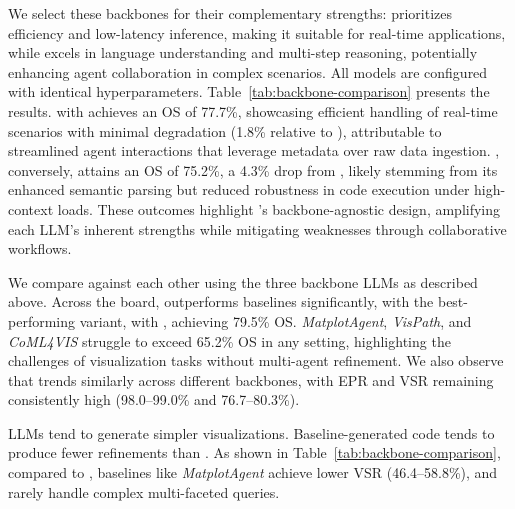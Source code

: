 We select these backbones for their complementary strengths:  prioritizes efficiency and low-latency inference, making it suitable for real-time applications, while  excels in language understanding and multi-step reasoning, potentially enhancing agent collaboration in complex scenarios. All models are configured with identical hyperparameters. Table~\ref{tab:backbone-comparison} presents the results. \methodname{} with  achieves an OS of 77.7\%, showcasing efficient handling of real-time scenarios with minimal degradation (1.8\% relative to ), attributable to streamlined agent interactions that leverage metadata over raw data ingestion. , conversely, attains an OS of 75.2\%, a 4.3\% drop from  , likely stemming from its enhanced semantic parsing but reduced robustness in code execution under high-context loads. These outcomes highlight \methodname{}'s backbone-agnostic design, amplifying each LLM's inherent strengths while mitigating weaknesses through collaborative workflows. 

We compare \methodname{} against each other using the three backbone LLMs as described above. Across the board, \methodname{} outperforms baselines significantly, with the best-performing variant, \methodname{} with  , achieving 79.5\% OS. \textit{MatplotAgent}, \textit{VisPath}, and \textit{CoML4VIS} struggle to exceed 65.2\% OS in any setting, highlighting the challenges of visualization tasks without multi-agent refinement. We also observe that \methodname{} trends similarly across different backbones, with EPR and VSR remaining consistently high (98.0--99.0\% and 76.7--80.3\%). 


LLMs tend to generate simpler visualizations. Baseline-generated code tends to produce fewer refinements than \methodname{}. As shown in Table~\ref{tab:backbone-comparison}, compared to \methodname{}, baselines like \textit{MatplotAgent} achieve lower VSR (46.4--58.8\%), and rarely handle complex multi-faceted queries.


